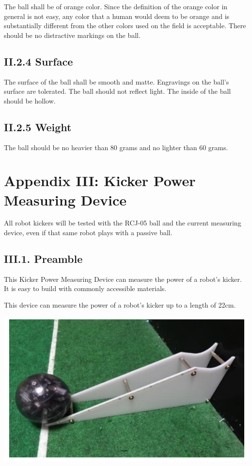 \documentclass{article}
\begin{document}
\textcolor{color-5}{The ball shall be of orange color. Since the definition of the orange color in general is not easy, any color that a human would deem to be orange and is substantially different from the other colors used on the field is acceptable. There should be no distractive markings on the ball.}

\subsection{\textcolor{color-5}{II.2.4 Surface}}

\textcolor{color-5}{The surface of the ball shall be smooth and matte. Engravings on the ball's surface are tolerated. The ball should not reflect light. The inside of the ball should be hollow.}

\subsection{\textcolor{color-5}{II.2.5 Weight}}

\textcolor{color-5}{The ball should be no heavier than 80 grams and no lighter than 60 grams.}

\section{\textcolor{color-5}{Appendix III: Kicker Power Measuring Device}\label{ref-064}}

\textcolor{color-5}{All robot kickers will be tested with the RCJ-05 ball and the current measuring device, even if that same robot plays with a passive ball.}

\subsection{III.1. Preamble} 

This Kicker Power Measuring Device can measure the power of a robot's kicker. It is easy to build with commonly accessible materials. 

This device can measure the power of a robot's kicker up to a length of 22cm.

\includegraphics[width=1\textwidth]{media/image8.png}
\end{document}
